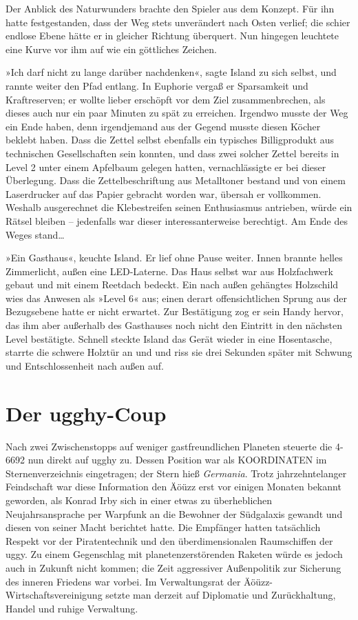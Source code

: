 Der Anblick des Naturwunders brachte den Spieler aus dem Konzept. Für ihn hatte festgestanden, dass der Weg stets unverändert nach Osten verlief; die schier endlose Ebene hätte er in gleicher Richtung überquert. Nun hingegen leuchtete eine Kurve vor ihm auf wie ein göttliches Zeichen.

»Ich darf nicht zu lange darüber nachdenken«, sagte Island zu sich selbst, und rannte weiter den Pfad entlang. In Euphorie vergaß er Sparsamkeit und Kraftreserven; er wollte lieber erschöpft vor dem Ziel zusammenbrechen, als dieses auch nur ein paar Minuten zu spät zu erreichen. Irgendwo musste der Weg ein Ende haben, denn irgendjemand aus der Gegend musste diesen Köcher beklebt haben. Dass die Zettel selbst ebenfalls ein typisches Billigprodukt aus technischen Gesellschaften sein konnten, und dass zwei solcher Zettel bereits in Level 2 unter einem Apfelbaum gelegen hatten, vernachlässigte er bei dieser Überlegung. Dass die Zettelbeschriftung aus Metalltoner bestand und von einem Laserdrucker auf das Papier gebracht worden war, übersah er vollkommen. Weshalb ausgerechnet die Klebestreifen seinen Enthusiasmus antrieben, würde ein Rätsel bleiben – jedenfalls war dieser interessanterweise berechtigt. Am Ende des Weges stand…

»Ein Gasthaus«, keuchte Island. Er lief ohne Pause weiter. Innen brannte helles Zimmerlicht, außen eine LED-Laterne. Das Haus selbst war aus Holzfachwerk gebaut und mit einem Reetdach bedeckt. Ein nach außen gehängtes Holzschild wies das Anwesen als »Level 6« aus; einen derart offensichtlichen Sprung aus der Bezugsebene hatte er nicht erwartet. Zur Bestätigung zog er sein Handy hervor, das ihm aber außerhalb des Gasthauses noch nicht den Eintritt in den nächsten Level bestätigte. Schnell steckte Island das Gerät wieder in eine Hosentasche, starrte die schwere Holztür an und und riss sie drei Sekunden später mit Schwung und Entschlossenheit nach außen auf.


\chapter{Der ugghy-Coup}

Nach zwei Zwischenstopps auf weniger gastfreundlichen Planeten steuerte die 4-6692 nun direkt auf ugghy zu. Dessen Position war als
KOORDINATEN %
im Sternenverzeichnis eingetragen; der Stern hieß \textit{Germania}. Trotz jahrzehntelanger Feindschaft war diese Information den Äöüzz erst vor einigen Monaten bekannt geworden, als Konrad Irby sich in einer etwas zu überheblichen Neujahrsansprache per Warpfunk an die Bewohner der Südgalaxis gewandt und diesen von seiner Macht berichtet hatte. Die Empfänger hatten tatsächlich Respekt vor der Piratentechnik und den überdimensionalen Raumschiffen der uggy. Zu einem Gegenschlag mit planetenzerstörenden Raketen würde es jedoch auch in Zukunft nicht kommen; die Zeit aggressiver Außenpolitik zur Sicherung des inneren Friedens war vorbei. Im Verwaltungsrat der Äöüzz-Wirtschaftsvereinigung setzte man derzeit auf Diplomatie und Zurückhaltung, Handel und ruhige Verwaltung.

